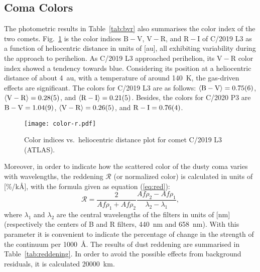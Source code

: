 \subsection{Coma Colors}

The photometric results in Table~\ref{tab:bvr} also summarises the color index of the two comets. 
Fig.~\ref{fig:color-r} is the color indices $\mathrm{B-V}$, $\mathrm{V-R}$, and $\mathrm{R-I}$ of C/2019 L3 as a function of heliocentric distance in units of [\unit{\astronomicalunit}], all exhibiting variability during the approach to perihelion. 
As C/2019 L3 approached perihelion, its $\mathrm{V-R}$ color index showed a tendency towards blue. 
Considering its position at a heliocentric distance of about {\qty{4}{\astronomicalunit}}, with a temperature of around {\qty{140}{\K}}, the gas-driven effects are significant. 
The colors for C/2019 L3 are as follows: 
$\langle \mathrm{B-V} \rangle = \num{0.75 +- 0.06}$, 
$\langle \mathrm{V-R} \rangle = \num{0.28 +- 0.05}$, and 
$\langle \mathrm{R-I} \rangle = \num{0.21 +- 0.05}$. 
Besides, the colors for C/2020 P3 are 
$\mathrm{B-V} = \num{1.04 +- 0.09}$, 
$\langle \mathrm{V-R} \rangle = \num{0.26 +- 0.05}$, and 
$\mathrm{R-I} = \num{0.76 +- 0.04}$.

\begin{figure}
    \centering
    \texttt{[image: color-r.pdf]} 
    \caption{Color indices vs.\ heliocentric distance plot for comet C/2019 L3 (ATLAS).}\label{fig:color-r}
\end{figure}

Moreover, in order to indicate how the scattered color of the dusty coma varies with wavelengths, the reddening $\mathcal{R}$ (or normalized color) \citep{jewitt_cometary_1986, lara_behaviour_2003, mazzotta_epifani_dust_2011, shi_ccd_2015} is calculated in units of [\unit{\percent/\kilo\angstrom}], with the formula given as equation (\ref{eq:red}): 
\begin{equation}
\mathcal{R} = \frac{2}{Af\rho_1 + Af\rho_2} \frac{Af\rho_2 - Af\rho_1}{\lambda_2 - \lambda_1}, 
\label{eq:red}
\end{equation}
where $\lambda_1$ and $\lambda_2$ are the central wavelengths of the filters in units of [\unit{\nm}] (respectively the centers of B and R filters, {\qty{440}{\nm}} and {\qty{658}{\nm}}). With this parameter it is convenient to indicate the percentage of change in the strength of the continuum per {\qty{1000}{\angstrom}}. The results of dust reddening are summarised in Table~\ref{tab:reddening}. In order to avoid the possible effects from background residuals, it is calculated  {\qty{20000}{\km}}. 

